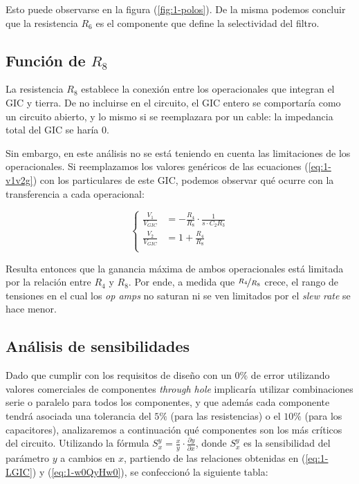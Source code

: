 \documentclass[../../tc_tp3_main.tex]{subfiles}
\begin{document}
Esto puede observarse en la figura (\ref{fig:1-polos}). De la misma podemos concluir que la resistencia $R_6$ es el componente que define la selectividad del filtro.


\subsection{Funci\'on de $R_8$}

La resistencia $R_8$ establece la conexi\'on entre los operacionales que integran el GIC y tierra. De no incluirse en el circuito, el GIC entero se comportar\'ia como un circuito abierto, y lo mismo si se reemplazara por un cable: la impedancia total del GIC se har\'ia 0. \par

Sin embargo, en este an\'alisis no se est\'a teniendo en cuenta las limitaciones de los operacionales. Si reemplazamos los valores gen\'ericos de las ecuaciones (\ref{eq:1-v1v2g}) con los particulares de este GIC, podemos observar qu\'e ocurre con la transferencia a cada operacional:

\begin{equation}
	\left\{
	 	\begin{aligned}
			\frac{V_1}{V_{GIC}} &= -\frac{R_4}{R_8} \cdot \frac{1}{s\cdot C_2 R_3}\\
			\frac{V_2}{V_{GIC}} &= 1+ \frac{R_4}{R_8} \\ 
		\end{aligned}
	\right.
	\label{eq:v1v2vgic}
 \end{equation}

Resulta entonces que la ganancia m\'axima de ambos operacionales est\'a limitada por la relaci\'on entre $R_4$ y $R_8$. Por ende, a medida que $\nicefrac{R_4}{R_8}$ crece, el rango de tensiones en el cual los \textit{op amps} no saturan ni se ven limitados por el \textit{slew rate} se hace menor. \par



\subsection{An\'alisis de sensibilidades}

Dado que cumplir con los requisitos de dise\~no con un $0\%$ de error utilizando valores comerciales de componentes \textit{through hole} implicar\'ia utilizar combinaciones serie o paralelo para todos los componentes, y que adem\'as cada componente tendr\'a asociada una tolerancia del $5\%$ (para las resistencias) o el $10\%$ (para los capacitores), analizaremos a continuaci\'on qu\'e componentes son los m\'as cr\'iticos del circuito. Utilizando la f\'ormula $S_{x}^{y} = \frac{x}{y} \cdot  \frac{\partial y}{\partial x}$, donde $S_x^y$ es la sensibilidad del par\'ametro $y$ a cambios en $x$, partiendo de las relaciones obtenidas en (\ref{eq:1-LGIC}) y (\ref{eq:1-w0QyHw0}), se confeccion\'o la siguiente tabla:
\end{document}
